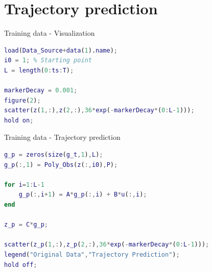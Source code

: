 \documentclass{beamer}
\begin{document}
\section{Trajectory prediction}

\begin{frame}[fragile]{Training data - Visualization}
    \begin{lstlisting}[language=Matlab]
load(Data_Source+data(1).name);
i0 = 1; % Starting point
L = length(0:ts:T);

markerDecay = 0.001;
figure(2);
scatter(z(1,:),z(2,:),36*exp(-markerDecay*(0:L-1)));
hold on;
    \end{lstlisting}
\end{frame}

\begin{frame}[fragile]{Training data - Trajectory prediction}
    \begin{lstlisting}[language=Matlab]
g_p = zeros(size(g_t,1),L);
g_p(:,1) = Poly_Obs(z(:,i0),P);

for i=1:L-1
    g_p(:,i+1) = A*g_p(:,i) + B*u(:,i);
end

z_p = C*g_p;

scatter(z_p(1,:),z_p(2,:),36*exp(-markerDecay*(0:L-1)));
legend("Original Data","Trajectory Prediction");
hold off;
    \end{lstlisting}
\end{frame}
\end{document}
